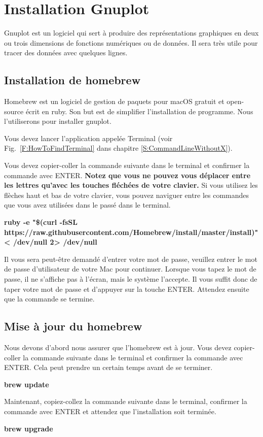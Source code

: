 \documentclass{article}
\newcommand\fig[1]{{Fig.~\ref{#1}}}
\begin{document}
\section{Installation Gnuplot}
Gnuplot est un logiciel qui sert à produire des représentations graphiques en deux ou trois dimensions de fonctions numériques ou de données. Il sera très utile pour tracer des données avec quelques lignes.
\subsection{Installation de homebrew}
Homebrew est un logiciel de gestion de paquets pour macOS gratuit et open-source écrit en ruby. Son but est de simplifier l'installation de programme. Nous l'utiliserons pour installer gnuplot.

Vous devez lancer l'application appelée Terminal (voir \fig{F:HowToFindTerminal} dans chapitre \ref{S:CommandLineWithoutX}).

Vous devez copier-coller la commande suivante dans le terminal et confirmer la commande avec ENTER. \textbf{Notez que vous ne pouvez vous déplacer entre les lettres qu'avec les touches fléchées de votre clavier. } Si vous utilisez les flèches haut et bas de votre clavier, vous pouvez naviguer entre les commandes que vous avez utilisées dans le passé dans le terminal.
\begin{tcolorbox}[width=\textwidth,colframe=Bittersweet,colback={black},title={Ceci est le terminal},outer arc=0mm,colupper=white]    
      \large\textbf{ruby -e "\$(curl -fsSL https://raw.githubusercontent.com/Homebrew/install/master/install)" < /dev/null 2> /dev/null}
\end{tcolorbox}
Il vous sera peut-être demandé d'entrer votre mot de passe, veuillez entrer le mot de passe d'utilisateur de votre Mac pour continuer. Lorsque vous tapez le mot de passe, il ne s'affiche pas à l'écran, mais le système l'accepte. Il vous suffit donc de taper votre mot de passe et d'appuyer sur la touche ENTER. Attendez ensuite que la commande se termine.
\subsection{Mise à jour du homebrew}
Nous devons d'abord nous assurer que l'homebrew est à jour.
Vous devez copier-coller la commande suivante dans le terminal et confirmer la commande avec ENTER. Cela peut prendre un certain temps avant de se terminer.
\begin{tcolorbox}[width=\textwidth,colframe=Bittersweet,colback={black},title={Ceci est le terminal},outer arc=0mm,colupper=white]    
      \large\textbf{brew update}
\end{tcolorbox}
Maintenant, copiez-collez la commande suivante dans le terminal, confirmer la commande avec ENTER et attendez que l'installation soit terminée.
\begin{tcolorbox}[width=\textwidth,colframe=Bittersweet,colback={black},title={Ceci est le terminal},outer arc=0mm,colupper=white]    
      \large\textbf{brew upgrade}
\end{tcolorbox}
\end{document}
